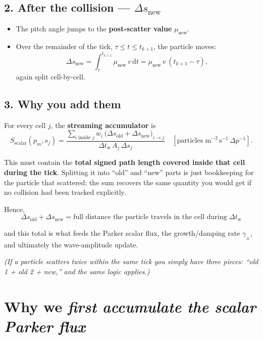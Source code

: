 {\subsection*{2. After the collision — $\Delta s_{\text{new}}$}

\begin{itemize}
  \item The pitch angle jumps to the \textbf{post-scatter value} $\mu_{\text{new}}$.
  \item Over the remainder of the tick, $\tau \leq t \leq t_{k+1}$, the particle moves:
  \[
  \Delta s_{\text{new}} = \int_{\tau}^{t_{k+1}} \mu_{\text{new}}\,v \,\mathrm{d}t
  = \mu_{\text{new}}\,v\,(t_{k+1} - \tau),
  \]
  again split cell-by-cell.
\end{itemize}

\subsection*{3. Why you add them}

For every cell $j$, the \textbf{streaming accumulator} is
\[
S_{\mathrm{scalar}}(p_m, s_j)
= \frac{
\displaystyle \sum_{i\;\text{inside }j}\!w_i\,
\bigl(\Delta s_{\text{old}} + \Delta s_{\text{new}}\bigr)_{i \to j}
}{
\displaystyle \Delta t_{\mathrm w} \, A_j \, \Delta s_j
}
\quad \left[\text{particles m}^{-2} \, \text{s}^{-1} \, \Delta p^{-1}\right].
\]

This must contain the \textbf{total signed path length covered inside that cell during the tick}. Splitting it into “old” and “new” parts is just bookkeeping for the particle that scattered; the sum recovers the same quantity you would get if no collision had been tracked explicitly.

\bigskip

\noindent Hence,
\[
\boxed{
\Delta s_{\text{old}} + \Delta s_{\text{new}}
= \text{full distance the particle travels in the cell during } \Delta t_{\mathrm w}
}
\]

\noindent and this total is what feeds the Parker scalar flux, the growth/damping rate $\gamma_\pm$, and ultimately the wave-amplitude update.

\bigskip

\textit{(If a particle scatters twice within the same tick you simply have three pieces: “old 1 + old 2 + new,” and the same logic applies.)}

\section*{Why we \emph{first accumulate the scalar Parker flux}}

}
